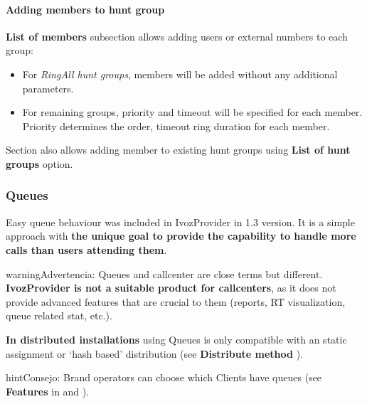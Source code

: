 \documentclass[letterpaper,10pt,spanish]{sphinxmanual}
\begin{document}
\paragraph{Adding members to hunt group}
\label{administration_portal/client/vpbx/routing_endpoints/hunt_groups:adding-members-to-hunt-group}
\textbf{List of members} subsection allows adding users or external numbers to each group:
\begin{itemize}
\item {} 
For \emph{RingAll hunt groups}, members will be added without any additional parameters.

\item {} 
For remaining groups, priority and timeout will be specified for each member. Priority determines the order, timeout ring
duration for each member.

\end{itemize}

Section {\hyperref[administration_portal/client/vpbx/users:users]{}} also allows adding member to existing hunt groups using \textbf{List of hunt groups} option.


\subsubsection{Queues}
\label{administration_portal/client/vpbx/routing_endpoints/queues:queues}\label{administration_portal/client/vpbx/routing_endpoints/queues::doc}\label{administration_portal/client/vpbx/routing_endpoints/queues:id1}
Easy queue behaviour was included in IvozProvider in 1.3 version. It is a simple
approach with \textbf{the unique goal to provide the capability to handle more calls
than users attending them}.

\begin{notice}{warning}{Advertencia:}
Queues and callcenter are close terms but different. \textbf{IvozProvider
is not a suitable product for callcenters}, as it does not provide
advanced features that are crucial to them (reports, RT visualization,
queue related stat, etc.).
\end{notice}

\textbf{In distributed installations} using Queues is only compatible with an static
assignment or `hash based' distribution (see \textbf{Distribute method} {\hyperref[administration_portal/brand/clients/virtual_pbx:virtual\string-pbx]{}}).

\begin{notice}{hint}{Consejo:}
Brand operators can choose which Clients have queues (see \textbf{Features}
in {\hyperref[getting_started/internal_calls/brand_portal:brand\string-configuration]{}} and {\hyperref[getting_started/internal_calls/client_portal:client\string-configuration]{}}).
\end{notice}
\end{document}
